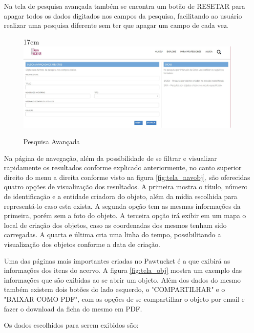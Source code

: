 \documentclass[a4paper,12pt,oneside,onecolumn,final,fleqn]{repUERJ}
\begin{document}
Na tela de pesquisa avançada também se encontra um botão de RESETAR para apagar todos os dados digitados nos campos da pesquisa, facilitando ao usuário realizar uma pesquisa diferente sem ter que apagar um campo de cada vez.

\begin{figure}[!ht]{17cm}
	\includegraphics[width=15cm, center]{figuras/pawtucket_buscaavancada.jpg}
	\caption{Pesquisa Avançada} \label{fig:tela_pesqav}
\end{figure}

Na página de navegação, além da possibilidade de se filtrar e visualizar rapidamente os resultados conforme explicado anteriormente, no canto superior direito do menu a direita conforme visto na figura \ref{fig:tela_navobj}, são oferecidas quatro opções de visualização dos resultados. A primeira mostra o título, número de identificação e a entidade criadora do objeto, além da mídia escolhida para representá-lo caso esta exista. A segunda opção tem as mesmas informações da primeira, porém sem a foto do objeto. A terceira opção irá exibir em um mapa o local de criação dos objetos, caso as coordenadas dos mesmos tenham sido carregadas. A quarta e última cria uma linha do tempo, possibilitando a visualização dos objetos conforme a data de criação.

Uma das páginas mais importantes criadas no Pawtucket é a que exibirá as informações dos itens do acervo. A figura \ref{fig:tela_obj} mostra um exemplo das informações que são exibidas ao se abrir um objeto. Além dos dados do mesmo também existem dois botões do lado esquerdo, o "COMPARTILHAR" e o "BAIXAR COMO PDF", com as opções de se compartilhar o objeto por email e fazer o download da ficha do mesmo em PDF.

Os dados escolhidos para serem exibidos são:
\end{document}
